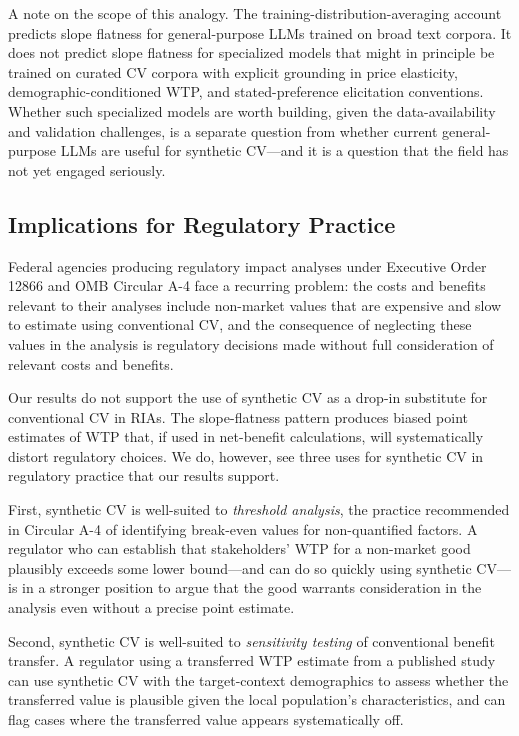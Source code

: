 \documentclass[12pt]{article}
\begin{document}
A note on the scope of this analogy. The training-distribution-averaging
account predicts slope flatness for general-purpose LLMs trained on
broad text corpora. It does not predict slope flatness for specialized
models that might in principle be trained on curated CV corpora with
explicit grounding in price elasticity, demographic-conditioned WTP, and
stated-preference elicitation conventions. Whether such specialized
models are worth building, given the data-availability and validation
challenges, is a separate question from whether current general-purpose
LLMs are useful for synthetic CV---and it is a question that the field
has not yet engaged seriously.

\subsection{Implications for Regulatory Practice}\label{sec:disc-policy}

Federal agencies producing regulatory impact analyses under Executive
Order 12866 and OMB Circular A-4 face a recurring problem: the costs
and benefits relevant to their analyses include non-market values that
are expensive and slow to estimate using conventional CV, and the
consequence of neglecting these values in the analysis is regulatory
decisions made without full consideration of relevant costs and benefits.

Our results do not support the use of synthetic CV as a drop-in
substitute for conventional CV in RIAs. The slope-flatness pattern
produces biased point estimates of WTP that, if used in net-benefit
calculations, will systematically distort regulatory choices. We do,
however, see three uses for synthetic CV in regulatory practice that
our results support.

First, synthetic CV is well-suited to \emph{threshold analysis}, the
practice recommended in Circular A-4 of identifying break-even values
for non-quantified factors. A regulator who can establish that
stakeholders' WTP for a non-market good plausibly exceeds some lower
bound---and can do so quickly using synthetic CV---is in a stronger
position to argue that the good warrants consideration in the analysis
even without a precise point estimate.

Second, synthetic CV is well-suited to \emph{sensitivity testing} of
conventional benefit transfer. A regulator using a transferred WTP
estimate from a published study can use synthetic CV with the
target-context demographics to assess whether the transferred value is
plausible given the local population's characteristics, and can flag
cases where the transferred value appears systematically off.
\end{document}
